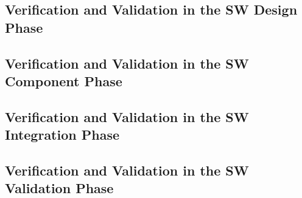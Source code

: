 \documentclass{template/openetcs_article}
\begin{document}
\addtocounter{subsection}{2}





\subsection{Verification and Validation in the SW Design Phase}
\label{sec:vnv-4}


\newpage
%

\newpage

\newpage



\newpage
\subsection{Verification and Validation in the SW Component Phase}
\label{sec:vnv-5}




\newpage

\newpage

\newpage

\newpage
{}
% 

\newpage
\subsection{Verification and Validation in the SW Integration Phase}
\label{sec:vnv-6}


\subsection{Verification and Validation in the SW Validation Phase}
\label{sec:vnv-7}
\end{document}
